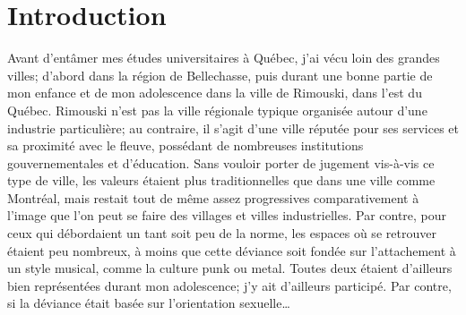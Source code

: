 \chapter*{Introduction}         %

Avant d'entâmer mes études universitaires à Québec, j'ai vécu loin des grandes villes; d'abord dans la région de Bellechasse, puis durant une bonne partie de mon enfance et de mon adolescence dans la ville de Rimouski, dans l'est du Québec.
Rimouski n'est pas la ville régionale typique organisée autour d'une industrie particulière; au contraire, il s'agit d'une ville réputée pour ses services et sa proximité avec le fleuve, possédant de nombreuses institutions gouvernementales et d'éducation.
Sans vouloir porter de jugement vis-à-vis ce type de ville, les valeurs étaient plus traditionnelles que dans une ville comme Montréal, mais restait tout de même assez progressives comparativement à l'image que l'on peut se faire des villages et villes industrielles.
Par contre, pour ceux qui débordaient un tant soit peu de la norme, les espaces où se retrouver étaient peu nombreux, à moins que cette déviance soit fondée sur l'attachement à un style musical, comme la culture punk ou metal.
Toutes deux étaient d'ailleurs bien représentées durant mon adolescence; j'y ait d'ailleurs participé.
Par contre, si la déviance était basée sur l'orientation sexuelle\ldots


